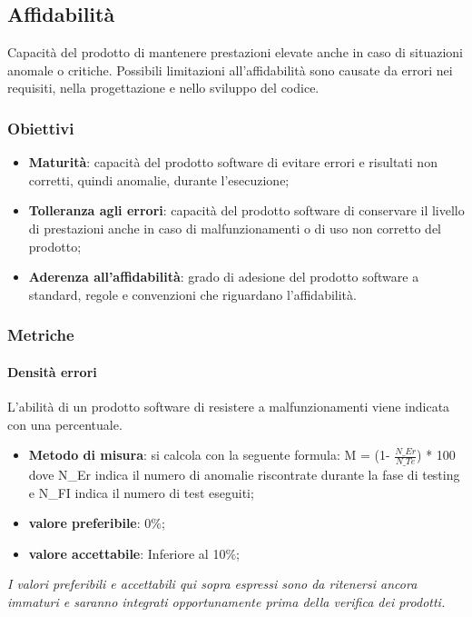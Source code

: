 \subsection{Affidabilità}
Capacità del prodotto di mantenere prestazioni elevate anche in caso di situazioni anomale o critiche.
Possibili limitazioni all’affidabilità sono causate da errori nei requisiti, nella progettazione e nello sviluppo del codice.

\subsubsection{Obiettivi}
\begin{itemize}
\item \textbf{Maturità}: capacità del prodotto software di evitare errori e risultati non corretti, quindi anomalie, durante l’esecuzione;
\item \textbf{Tolleranza agli errori}: capacità del prodotto software di conservare il livello di prestazioni anche in caso di malfunzionamenti o di uso non corretto del prodotto;
\item \textbf{Aderenza all'affidabilità}: grado di adesione del prodotto software a standard, regole e convenzioni che riguardano l'affidabilità.
\end{itemize}

\subsubsection{Metriche}

\paragraph{Densità errori}
L'abilità di un prodotto software di resistere a malfunzionamenti viene indicata con una percentuale.
\begin{itemize}
\item \textbf{Metodo di misura}: si calcola con la seguente formula:
M = (1- $\frac{N\_Er}{N\_Te}$) * 100
dove N\_Er indica il numero di anomalie riscontrate durante la fase di testing e N\_FI indica il numero di test eseguiti;
\item \textbf{valore preferibile}: 0\%;
\item \textbf{valore accettabile}: Inferiore al 10\%;
\end{itemize}
\textit{I valori preferibili e accettabili qui sopra espressi sono da ritenersi ancora immaturi e saranno integrati opportunamente prima della verifica dei prodotti.}

